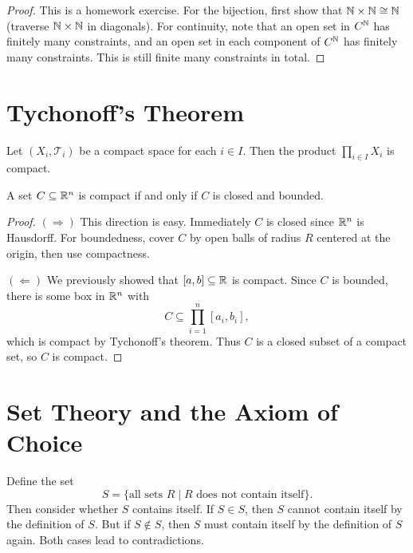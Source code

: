\begin{proof}
  This is a homework exercise. For the bijection,
  first show that
  $\mathbb{N} \times \mathbb{N} \cong \mathbb{N}$ (traverse $\mathbb{N} \times \mathbb{N}$
  in diagonals). For continuity, note that an open set
  in $C^{\mathbb{N}}$ has finitely many constraints, and an
  open set in each component of $C^{\mathbb{N}}$ has finitely
  many constraints. This is still finite many
  constraints in total.
\end{proof}

\section{Tychonoff's Theorem}

\begin{theorem}
  Let $(X_i, \mathcal{T}_i)$ be a compact space
  for each $i \in I$. Then the product
  $\prod_{i \in I} X_i$ is compact.
\end{theorem}

\begin{corollary}
  A set $C \subseteq \mathbb{R}^n$ is compact if and only
  if $C$ is closed and bounded.
\end{corollary}

\begin{proof}
  $(\Rightarrow)$ This direction is easy. Immediately
  $C$ is closed since $\mathbb{R}^n$ is Hausdorff. For
  boundedness, cover $C$ by open balls of radius $R$
  centered at the origin, then use compactness.

  $(\Leftarrow)$ We previously showed that
  $[a, b] \subseteq \mathbb{R}$ is compact. Since $C$ is
  bounded, there is some box in $\mathbb{R}^n$ with
  \[
    C \subseteq \prod_{i=1}^n [a_i, b_i],
  \]
  which is compact by Tychonoff's theorem. Thus
  $C$ is a closed subset of a compact set, so $C$ is
  compact.
\end{proof}

\section{Set Theory and the Axiom of Choice}

\begin{example}
  Define the set
  \[
    S = \{\text{all sets $R$} \mid \text{$R$ does not contain itself}\}.
  \]
  Then consider whether $S$ contains itself.
  If $S \in S$, then $S$ cannot contain itself by
  the definition of $S$. But
  if $S \notin S$, then $S$ must contain itself
  by the definition of $S$ again. Both
  cases lead to contradictions.
\end{example}

